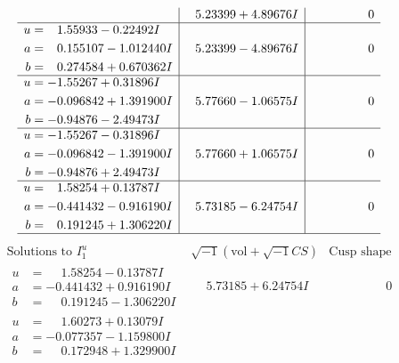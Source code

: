 \documentclass[1p]{elsarticle_modified}
\theoremstyle{definition}
\newcommand{\I}{\sqrt{-1}}
\begin{document}
$$\begin{array}{c|c|c}
 & \phantom{-}5.23399 + 4.89676 I & \phantom{-0.000000 } 0 \\ \hline\begin{aligned}
u &= \phantom{-}1.55933 - 0.22492 I \\
a &= \phantom{-}0.155107 - 1.012440 I \\
b &= \phantom{-}0.274584 + 0.670362 I\end{aligned}
 & \phantom{-}5.23399 - 4.89676 I & \phantom{-0.000000 } 0 \\ \hline\begin{aligned}
u &= -1.55267 + 0.31896 I \\
a &= -0.096842 + 1.391900 I \\
b &= -0.94876 - 2.49473 I\end{aligned}
 & \phantom{-}5.77660 - 1.06575 I & \phantom{-0.000000 } 0 \\ \hline\begin{aligned}
u &= -1.55267 - 0.31896 I \\
a &= -0.096842 - 1.391900 I \\
b &= -0.94876 + 2.49473 I\end{aligned}
 & \phantom{-}5.77660 + 1.06575 I & \phantom{-0.000000 } 0 \\ \hline\begin{aligned}
u &= \phantom{-}1.58254 + 0.13787 I \\
a &= -0.441432 - 0.916190 I \\
b &= \phantom{-}0.191245 + 1.306220 I\end{aligned}
 & \phantom{-}5.73185 - 6.24754 I & \phantom{-0.000000 } 0\\
 \hline 
 \end{array}$$\newpage$$\begin{array}{c|c|c}  
\text{Solutions to }I^u_{1}& \I (\text{vol} + \sqrt{-1}CS) & \text{Cusp shape}\\
 \hline 
\begin{aligned}
u &= \phantom{-}1.58254 - 0.13787 I \\
a &= -0.441432 + 0.916190 I \\
b &= \phantom{-}0.191245 - 1.306220 I\end{aligned}
 & \phantom{-}5.73185 + 6.24754 I & \phantom{-0.000000 } 0 \\ \hline\begin{aligned}
u &= \phantom{-}1.60273 + 0.13079 I \\
a &= -0.077357 - 1.159800 I \\
b &= \phantom{-}0.172948 + 1.329900 I\end{aligned}

\end{array}$$
\end{document}

